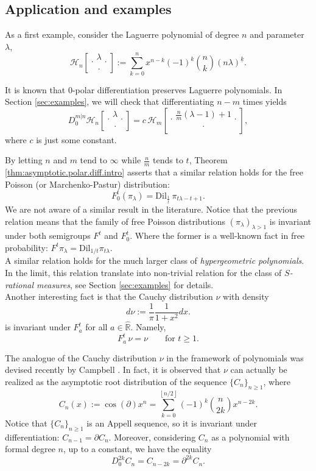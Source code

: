 \documentclass[reqno,11pt]{amsart}
\theoremstyle{remark}
\newcommand{\rr}{\mathbb{R}}
\newcommand{\dil}[1]{\mbox{Dil}_{#1}}
\newcommand{\falling}[2]{\left(#1\right)^{\underline{#2}}}
\newcommand*\HGP[3]{%
 \mathcal{H}_{#1}{\left[\genfrac..{0pt}{1}{#2}{#3}\right]}%
}
\newcommand{\polar}[1]{D_{#1}}
\newcommand{\polars}[3]{D_{#1}^{#2|#3}}
\newcommand{\freepower}[1]{F^{#1}}
\newcommand{\pfreepower}[2]{F_{#1}^{#2}}
\begin{document}
\subsection{Application and examples}

As a first example, consider the Laguerre polynomial of degree $n$ and parameter $\lambda$,
$$\HGP{n}{\lambda}{\cdot}:=\sum_{k=0}^n x^{n-k} (-1)^k \binom{n}{k} \falling{n\lambda}{k}.$$

It is known that 0-polar differentiation preserves Laguerre polynomials. In Section \ref{sec:examples}, we will check that  differentiating $n-m$ times yields
$$\polars{0}{m}{n}\HGP{n}{\lambda}{\cdot}=c \, \HGP{m}{\frac{n}{m}(\lambda-1)+1}{\cdot},$$ 
where $c$ is just some constant.

By letting $n$ and $m$ tend to $\infty$ while $\frac{n}{m}$ tends to $t$, Theorem \ref{thm:asymptotic.polar.diff.intro} asserts that a similar relation holds for the free Poisson (or Marchenko-Pastur) distribution: 
$$
F_0^t\left( \pi_\lambda \right) = \dil{\frac{1}{t}}\,  \pi_{t\lambda-t+1}.
$$
We are not aware of a similar result in the literature. Notice that the previous relation means that the family of free Poisson distributions $(\pi_\lambda)_{\lambda > 1}$ is invariant under both semigroups $\freepower{t}$ and $ \pfreepower{0}{t}$. Where the former is a well-known fact in free probability: $\freepower{t} \pi_\lambda= \dil{1/t} \pi_{t\lambda}$.\\

A similar relation holds for the much larger class of \emph{hypergeometric polynomials}. In the limit, this relation translate into non-trivial relation for the class of \emph{$S$-rational measures}, see Section \ref{sec:examples} for details.\\ 

Another interesting fact is that the Cauchy distribution $\nu$ with density $$ d\nu := \frac{1}{\pi}\frac{1}{1+x^2}dx.$$ 
is invariant under $\pfreepower{a}{t}$ for all $a\in \hat{\rr}$. Namely,
$$ \pfreepower{a}{t}\, \nu = \nu \qquad \text{for } t\geq 1. $$ 

The analogue of the Cauchy distribution $\nu$ in the framework of polynomials was devised recently by Campbell \cite[Theorem 2.4]{campbell2024free}. In fact, it is observed that $\nu$ can actually be realized as the asymptotic root distribution of the sequence $ \{C_n\}_{n\geq 1} $, where
$$ C_n(x) := \cos(\partial)x^n =\sum_{k=0}^{\left\lfloor n/2 \right\rfloor} (-1)^k \binom{n}{2k} x^{n-2k}. $$
Notice that $ \{C_n\}_{n\geq 1} $ is an Appell sequence, so it is invariant under differentiation: $ C_{n-1}=\partial C_n $. Moreover, considering $C_n$ as a polynomial with formal degree $n$, up to a constant, we have the equality 
$$ \polar{0}^{2k}C_n = C_{n-2k}=\partial^{2k}C_n.$$
\end{document}
